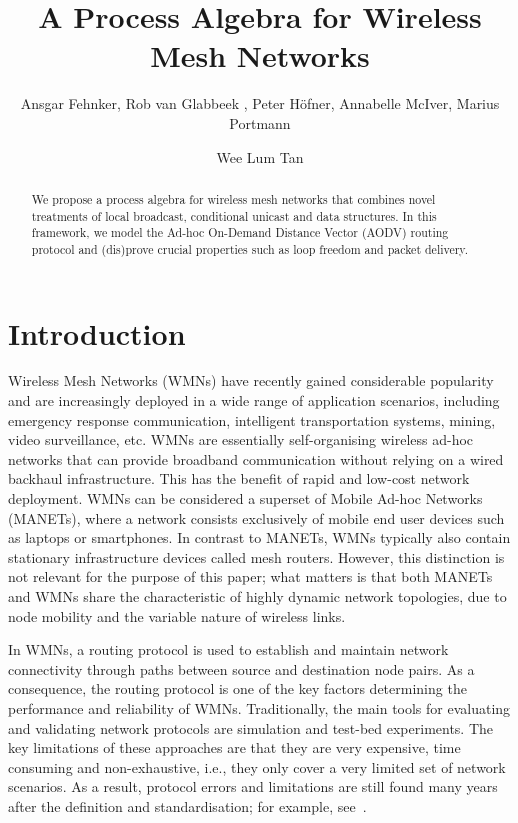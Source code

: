 \documentclass[envcountsame,envcountsect,orivec,runningheads]{llncs}
\begin{document}
 
\title{A Process Algebra for Wireless Mesh Networks}
  \author{
  Ansgar Fehnker,
  Rob van Glabbeek ,
  Peter H\"ofner,
  Annabelle McIver,
  Marius Portmann\and
  Wee Lum Tan
  }

\maketitle 
\setcounter{footnote}{0}

\begin{abstract}
We propose a process algebra for wireless mesh networks that combines
novel treatments of local broadcast, conditional unicast and data
structures.  In this framework, we model the Ad-hoc On-Demand Distance
Vector (AODV) routing protocol and (dis)prove crucial properties such
as loop freedom and packet delivery.
\end{abstract}

\section{Introduction}\label{sec:introduction}
Wireless Mesh Networks (WMNs) have recently gained considerable
popularity and are increasingly deployed in a wide range of
application scenarios, including emergency response communication,
intelligent transportation systems, mining, video surveillance, etc.
WMNs are essentially self-organising wireless ad-hoc networks that can
provide broadband communication without relying on a wired backhaul
infrastructure.  This has the benefit of rapid and low-cost network
deployment. WMNs can be considered a superset of Mobile Ad-hoc
Networks (MANETs), where a network consists exclusively of mobile end
user devices such as laptops or smartphones. 
In contrast to MANETs,
WMNs typically also contain stationary infrastructure devices called
mesh routers. However, this distinction is not relevant for the
purpose of this paper; what matters is that both MANETs and WMNs share
the characteristic of highly dynamic network topologies, due to node
mobility and the variable nature of wireless links.

In WMNs, a routing protocol is used to establish and maintain network
connectivity through paths between source and destination node
pairs. As a consequence, the routing protocol is one of the key
factors determining the performance and reliability of WMNs.
Traditionally, the main tools for evaluating and validating network
protocols are simulation and test-bed experiments.  The key limitations
of these approaches are that they are very expensive, time consuming
and non-exhaustive, i.e., they only cover a very limited set of
network scenarios. As a result, protocol errors and limitations are
still found many years after the definition and standardisation; for
example, see~\cite{MK10}.
\end{document}
